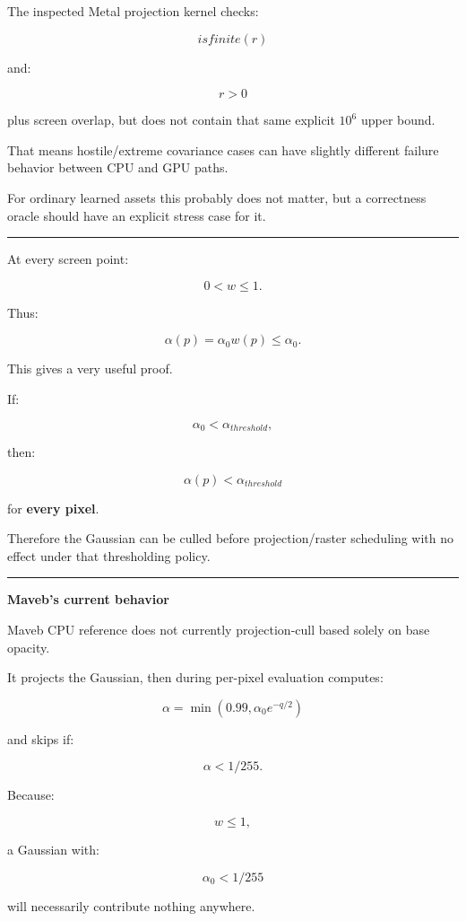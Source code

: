 The inspected Metal projection kernel checks:

\[
isfinite(r)
\]

and:

\[
r>0
\]

plus screen overlap, but does not contain that same explicit \(10^6\) upper bound.

That means hostile/extreme covariance cases can have slightly different failure behavior between CPU and GPU paths.

For ordinary learned assets this probably does not matter, but a correctness oracle should have an explicit stress case for it.

\begin{center}\rule{0.5\linewidth}{0.5pt}\end{center}

At every screen point:

\[
0<w\le1.
\]

Thus:

\[
\alpha(p)
=
\alpha_0w(p)
\le
\alpha_0.
\]

This gives a very useful proof.

If:

\[
\alpha_0<\alpha_{threshold},
\]

then:

\[
\alpha(p)
<
\alpha_{threshold}
\]

for \textbf{every pixel}.

Therefore the Gaussian can be culled before projection/raster scheduling with no effect under that thresholding policy.

\begin{center}\rule{0.5\linewidth}{0.5pt}\end{center}

\textbf{Maveb's current behavior}

Maveb CPU reference does not currently projection-cull based solely on base opacity.

It projects the Gaussian, then during per-pixel evaluation computes:

\[
\alpha
=
\min(
0.99,
\alpha_0
e^{-q/2}
)
\]

and skips if:

\[
\boxed{
\alpha<
1/255.
}
\]

Because:

\[
w\le1,
\]

a Gaussian with:

\[
\alpha_0<1/255
\]

will necessarily contribute nothing anywhere.


